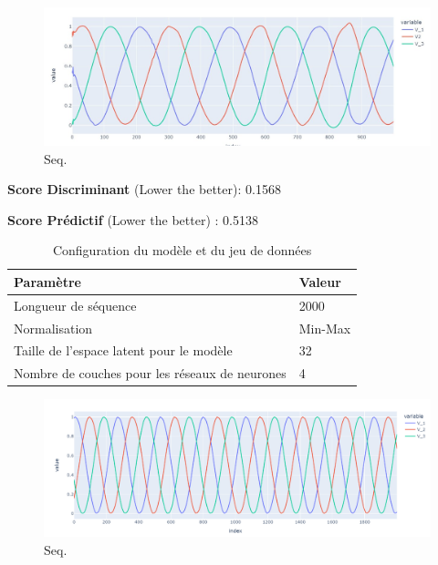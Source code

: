 \begin{figure}[hbt!]
  \centering
  \includegraphics[width=14cm]{images_pfe/fake_1000.jpg}
  \caption{Seq.}
  \label{fig:fake_1000}
\end{figure}
\FloatBarrier
\medskip

\textbf{Score Discriminant} (Lower the better): 0.1568

\textbf{Score Prédictif}  (Lower the better) : 0.5138

\begin{table}[h!]
  \centering
  \begin{tabular}{|l|l|}
    \hline
    \textbf{Paramètre}                             & \textbf{Valeur} \\ \hline
    Longueur de séquence                           & 2000            \\ \hline
    Normalisation                                  & Min-Max         \\ \hline
    Taille de l'espace latent pour le modèle       & 32              \\ \hline
    Nombre de couches pour les réseaux de neurones & 4               \\ \hline
  \end{tabular}
  \caption{Configuration du modèle et du jeu de données}
\end{table}

\begin{figure}[hbt!]
  \centering
  \includegraphics[width=14cm]{images_pfe/real_2000.png}
  \caption{Seq.}
  \label{fig:real_1000}
\end{figure}
\FloatBarrier
\medskip

